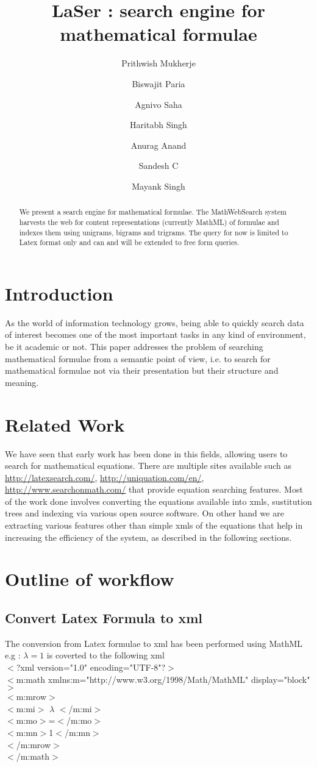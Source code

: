 \documentclass[
journal=jacsat, %
manuscript=article]{achemso}
\author{Prithwish Mukherje}
\author{Biswajit Paria}
\author{Agnivo Saha}
\author{Haritabh Singh}
\author{Anurag Anand}
\author{Sandesh C}
\author{Mayank Singh}
\affiliation[IIT Kharagpur]
{Department of Computer Science, IIT, Kharagpur}
\title[\texttt{achemso} demonstration]
{LaSer : search engine for mathematical formulae}
\begin{document}
\begin{abstract}
We present a search engine for mathematical formulae. The
MathWebSearch system harvests the web for content representations
(currently MathML) of formulae and indexes them using unigrams, 
bigrams and trigrams. The query for now is limited to Latex format only and can and will be extended to free form queries.

\end{abstract}


\section{Introduction}

As the world of information technology grows, being able to quickly
search data of interest becomes one of the most important tasks in
any kind of environment, be it academic or not. This paper addresses
the problem of searching mathematical formulae from a semantic
point of view, i.e. to search for mathematical formulae not via their
presentation but their structure and meaning.


\section{Related Work}

We have seen that early work has been done in this fields, allowing users to search for mathematical equations. 
There are multiple sites available such as \url{http://latexsearch.com/}, \url{http://uniquation.com/en/}, \url{http://www.searchonmath.com/} 
that provide equation searching features. Most of the work done involves converting the equations available into xmls,
sustitution trees and indexing via various open source software. On other hand we are extracting various features other than simple 
xmls of the equations that help in increasing the efficiency of the system, as described in the following sections.

\section{Outline of workflow}

	\subsection{Convert Latex Formula to xml}
	
	The conversion from Latex formulae to xml has been performed using MathML\\
	e.g : $\lambda = 1$ is coverted to the following xml\\ 
	$<$?xml version="1.0" encoding="UTF-8"?$>$\\
	$<$m:math xmlns:m="http://www.w3.org/1998/Math/MathML" display="block"$>$\\
	  $<$m:mrow$>$\\
	    $<$m:mi$>$ $\lambda$ $<$/m:mi$>$\\
	    $<$m:mo$>$=$<$/m:mo$>$\\
	    $<$m:mn$>$1$<$/m:mn$>$\\
	  $<$/m:mrow$>$\\
	$<$/m:math$>$
	
\end{document}
